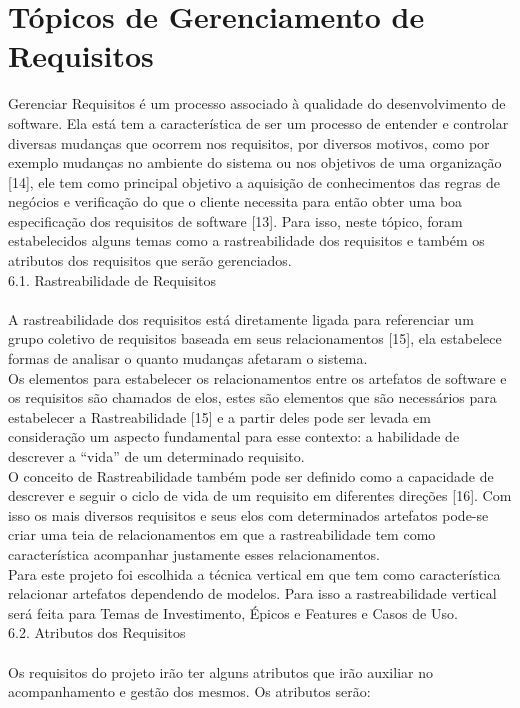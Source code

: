 {{\section{Tópicos de Gerenciamento de Requisitos}
\label{sec:nova_sess_o}

\tab Gerenciar Requisitos é um processo associado à qualidade do desenvolvimento de software. Ela está tem a característica de ser um processo de entender e controlar diversas mudanças que ocorrem nos requisitos, por diversos motivos, como por exemplo mudanças no ambiente do sistema ou nos objetivos de uma organização [14], ele tem como principal objetivo a aquisição de conhecimentos das regras de negócios e verificação do que o cliente necessita para então obter uma boa especificação dos requisitos de software [13]. Para isso, neste tópico, foram estabelecidos alguns temas como a rastreabilidade dos requisitos e também os atributos dos requisitos que serão gerenciados.\\

{\large{6.1. Rastreabilidade de Requisitos}}\\ \\
\tab A rastreabilidade dos requisitos está diretamente ligada para referenciar um grupo coletivo de requisitos baseada em seus relacionamentos [15], ela estabelece formas de analisar o quanto mudanças afetaram o sistema.\\
\tab Os elementos para estabelecer os relacionamentos entre os artefatos de software e os requisitos são chamados de elos, estes são elementos que são necessários para estabelecer a Rastreabilidade [15] e a partir deles pode ser levada em consideração um aspecto fundamental para esse contexto: a habilidade de descrever a “vida” de um determinado requisito.\\
\tab O conceito de Rastreabilidade também pode ser definido como a capacidade de descrever e seguir o ciclo de vida de um requisito em diferentes direções [16]. Com isso os mais diversos requisitos e seus elos com determinados artefatos pode-se criar uma teia de relacionamentos em que a rastreabilidade tem como característica acompanhar justamente esses relacionamentos.\\
\tab Para este projeto foi escolhida a técnica vertical em que tem como característica relacionar artefatos dependendo de modelos. Para isso a rastreabilidade vertical será feita para Temas de Investimento, Épicos e Features e Casos de Uso.\\

{\large{6.2. Atributos dos Requisitos}}\\ \\
\tab Os requisitos do projeto irão ter alguns atributos que irão auxiliar no acompanhamento e gestão dos mesmos. Os atributos serão:\\




}}
